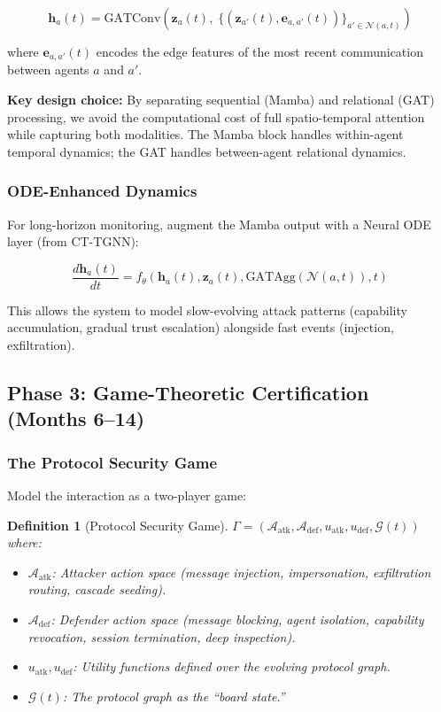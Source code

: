 \documentclass[12pt,a4paper]{article}
\newtheorem{definition}[theorem]{Definition}
\newcommand{\calG}{\mathcal{G}}
\begin{document}
\begin{equation}
    \mathbf{h}_a(t) = \text{GATConv}\left(\mathbf{z}_a(t),\; \{(\mathbf{z}_{a'}(t), \mathbf{e}_{a,a'}(t))\}_{a' \in \mathcal{N}(a,t)}\right)
\end{equation}

where $\mathbf{e}_{a,a'}(t)$ encodes the edge features of the most recent communication between agents $a$ and $a'$.

\textbf{Key design choice:} By separating sequential (Mamba) and relational (GAT) processing, we avoid the computational cost of full spatio-temporal attention while capturing both modalities. The Mamba block handles within-agent temporal dynamics; the GAT handles between-agent relational dynamics.

\subsubsection{ODE-Enhanced Dynamics}

For long-horizon monitoring, augment the Mamba output with a Neural ODE layer (from CT-TGNN):

\begin{equation}
    \frac{d\mathbf{h}_a(t)}{dt} = f_\theta\left(\mathbf{h}_a(t), \mathbf{z}_a(t), \text{GATAgg}(\mathcal{N}(a,t)), t\right)
\end{equation}

This allows the system to model slow-evolving attack patterns (capability accumulation, gradual trust escalation) alongside fast events (injection, exfiltration).

\subsection{Phase 3: Game-Theoretic Certification (Months 6--14)}

\subsubsection{The Protocol Security Game}

Model the interaction as a two-player game:

\begin{definition}[Protocol Security Game]
$\Gamma = (\mathcal{A}_{\text{atk}}, \mathcal{A}_{\text{def}}, u_{\text{atk}}, u_{\text{def}}, \calG(t))$ where:
\begin{itemize}
    \item $\mathcal{A}_{\text{atk}}$: Attacker action space (message injection, impersonation, exfiltration routing, cascade seeding).
    \item $\mathcal{A}_{\text{def}}$: Defender action space (message blocking, agent isolation, capability revocation, session termination, deep inspection).
    \item $u_{\text{atk}}, u_{\text{def}}$: Utility functions defined over the evolving protocol graph.
    \item $\calG(t)$: The protocol graph as the ``board state.''
\end{itemize}
\end{definition}
\end{document}
